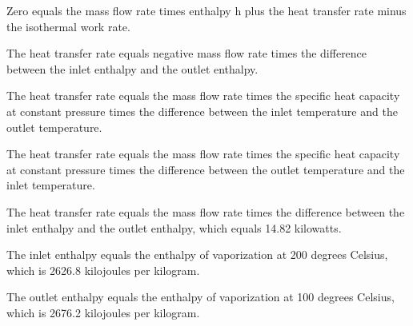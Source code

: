 Zero equals the mass flow rate times enthalpy h plus the heat transfer rate minus the isothermal work rate.

The heat transfer rate equals negative mass flow rate times the difference between the inlet enthalpy and the outlet enthalpy.

The heat transfer rate equals the mass flow rate times the specific heat capacity at constant pressure times the difference between the inlet temperature and the outlet temperature.

The heat transfer rate equals the mass flow rate times the specific heat capacity at constant pressure times the difference between the outlet temperature and the inlet temperature.

The heat transfer rate equals the mass flow rate times the difference between the inlet enthalpy and the outlet enthalpy, which equals 14.82 kilowatts.

The inlet enthalpy equals the enthalpy of vaporization at 200 degrees Celsius, which is 2626.8 kilojoules per kilogram.

The outlet enthalpy equals the enthalpy of vaporization at 100 degrees Celsius, which is 2676.2 kilojoules per kilogram.
